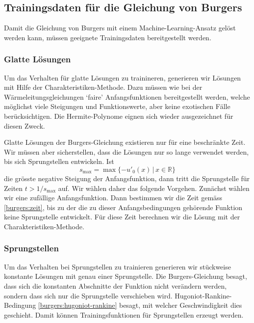 %
%
%
\subsection{Trainingsdaten für die Gleichung von Burgers\label{burgers:training}}
Damit die Gleichung von Burgers mit einem Machine-Learning-Ansatz gelöst
werden kann, müssen geeignete Trainingsdaten bereitgestellt werden.


\subsubsection{Glatte Lösungen}
Um das Verhalten für glatte Lösungen zu trainineren, generieren
wir Lösungen mit Hilfe der Cha\-rak\-te\-ris\-ti\-ken-Methode.
Dazu müssen wie bei der Wärmeleitungsgleichungen `faire' Anfangsfunktionen 
bereitgestellt werden, welche möglichst viele Steigungen und Funktionswerte,
aber keine exotischen Fälle berücksichtigen.
Die Hermite-Polynome eignen sich wieder ausgezeichnet für diesen Zweck.

Glatte Lösungen der Burgers-Gleichung existieren nur für eine beschränkte Zeit.
Wir müssen aber sicherstellen, dass die Lösungen nur so lange verwendet
werden, bis sich Sprungstellen entwickeln.
Ist
\begin{equation}
s_{\text{max}} = \max \{ -u'_0(x)\,|\, x\in\mathbb R\}
\label{burgers:zeit}
\end{equation}
die grösste negative Steigung der Anfangsfunktion, dann tritt die Sprungstelle
für Zeiten $t> 1/s_{\text{max}}$ auf.
Wir wählen daher das folgende Vorgehen.
Zunächst wählen wir eine zufällige Anfangsfunktion.
Dann bestimmen wir die Zeit
gemäss \eqref{burgers:zeit}, bis zu der die zu dieser Anfangsbedingungen
gehörende Funktion keine Sprungstelle entwickelt.
Für diese Zeit berechnen wir die Lösung mit der Charakteristiken-Methode.

\subsubsection{Sprungstellen}
Um das Verhalten bei Sprungstellen zu trainieren generieren wir
stückweise konstante Lösungen mit genau einer Sprungstelle.
Die Burgers-Gleichung besagt, dass sich die konstanten Abschnitte
der Funktion nicht verändern werden, sondern dass sich nur die Sprungstelle
verschieben wird.
Hugoniot-Rankine-Bedingung \eqref{burgers:hugoniot-rankine} besagt,
mit welcher Geschwindigkeit dies geschieht.
Damit können Trainingsfunktionen für Sprungstellen erzeugt werden.


